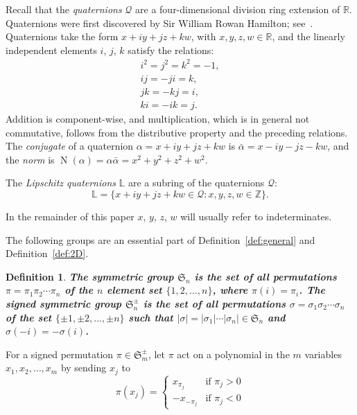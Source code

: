 \documentclass[12pt,table]{article}
\newtheorem{definition}[theorem]{Definition}
\numberwithin{equation}{section}
\DeclareMathOperator{\N}{N}
\newcommand{\Rrr}{\mathbb R}
\newcommand{\Zzz}{\mathbb Z}
\newcommand{\Lll}{\mathbb L}
\begin{document}
\begin{landscape}
{{Recall that
the \emph{quaternions} $\mathscr{Q}$ are a four-dimensional division ring extension of $\Rrr$.
Quaternions were first discovered by Sir William Rowan Hamilton;
see~\cite{Hamilton}.
Quaternions take the form $x + iy + jz + kw$, with
$x,y,z,w \in \Rrr$, and the linearly independent
elements $i$, $j$, $k$ satisfy the relations:
\begin{align*}
i^2 = j^2 = k^2 = -1,
\\
ij = -ji = k,
\\
jk = -kj = i,
\\
ki = -ik = j.
\end{align*}
Addition is component-wise, and multiplication, which is
in general not commutative,
follows from the distributive property and the preceding relations.
The \emph{conjugate} of a quaternion $ \alpha = x + iy + jz + kw$
is $ \bar{\alpha} = x - iy - jz - kw$,  
and the \emph{norm} is 
$ \N( \alpha ) = \alpha \bar{\alpha} = x^2 + y^2 + z^2 + w^2$.  

The \emph{Lipschitz quaternions} $ \Lll $ are a subring of
the quaternions $\mathscr{Q}$:
\[
\Lll = \{ x + iy + jz + kw \in \mathscr{Q}: x,y,z,w \in \Zzz \}.
\]


In the remainder of this paper $x$, $y$, $z$, $w$ will
usually refer to indeterminates.



The following groups are an essential part of Definition~\ref{def:general}
and Definition~\ref{def:2D}.
\begin{definition}
\bf
The {\em symmetric group} $ \mathfrak{S}_n $ is the 
set of all permutations $ \pi = \pi_1 \pi_2 \dotsm \pi_n $ 
of the $ n $ element set $ \{ 1, 2, \dotsc, n \} $,
where $ \pi(i) = \pi_i $.
The {\em signed symmetric group} $ \mathfrak{S}_n^\pm $
is the set of all permutations $ \sigma = \sigma_1 \sigma_2 \dotsm \sigma_n$
of the set $ \{ \pm 1, \pm 2, \dotsc, \pm n \} $ such that
$ | \sigma | = | \sigma_1 | \dotsm |\sigma_n| \in \mathfrak{S}_n $
and $ \sigma(-i) =  -\sigma(i) $.   
\end{definition}



For a signed permutation $ \pi \in \mathfrak{S}_m^\pm $,
let $ \pi $ act on a polynomial in the 
$m$ variables $ x_1,x_2, \dotsc, x_m $ by sending $ x_j $ to 
\[
\pi(x_j) =
\begin{cases}
x_{\pi_j} & \text{if } \pi_j > 0 \\
-x_{-\pi_j} & \text{if } \pi_j < 0
\end{cases}
\]

}}
\end{landscape}
\end{document}
